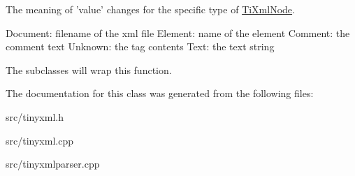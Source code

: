 \label{d3/dd5/classTiXmlNode_a77943eb90d12c2892b1337a9f5918b41}
\-The meaning of 'value' changes for the specific type of \hyperlink{classTiXmlNode}{\-Ti\-Xml\-Node}. \begin{DoxyVerb}
		Document:	filename of the xml file
		Element:	name of the element
		Comment:	the comment text
		Unknown:	the tag contents
		Text:		the text string
		\end{DoxyVerb}


\-The subclasses will wrap this function. 

\-The documentation for this class was generated from the following files\-:\begin{DoxyCompactItemize}
\item 
src/tinyxml.\-h\item 
src/tinyxml.\-cpp\item 
src/tinyxmlparser.\-cpp\end{DoxyCompactItemize}
